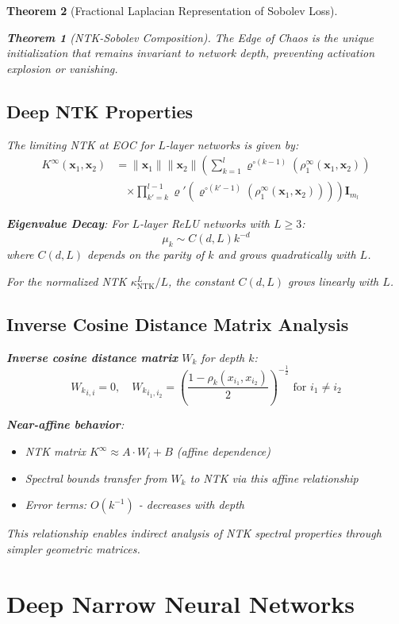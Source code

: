 \documentclass{article}
\newtheorem{theorem}{Theorem}[section]
\begin{document}
\begin{theorem}[Fractional Laplacian Representation of Sobolev Loss]
\begin{theorem}[NTK-Sobolev Composition]
The Edge of Chaos is the unique initialization that remains invariant to network depth, preventing activation explosion or vanishing.



\subsection{Deep NTK Properties}

The limiting NTK at EOC for $L$-layer networks is given by:
\begin{align}
K^{\infty}(\mathbf{x}_1, \mathbf{x}_2) &= \|\mathbf{x}_1\| \|\mathbf{x}_2\| \left( \sum_{k=1}^l \varrho^{\circ (k-1)}\left(\rho_1^{\infty}(\mathbf{x}_1, \mathbf{x}_2)\right) \right. \\
&\quad \left. \times \prod_{k'=k}^{l-1} \varrho'\left(\varrho^{\circ (k'-1)}\left(\rho_1^{\infty}(\mathbf{x}_1, \mathbf{x}_2)\right)\right) \right) \mathbf{I}_{m_l}
\end{align}

\textbf{Eigenvalue Decay}: For $L$-layer ReLU networks with $L \geq 3$:
\[ \mu_k \sim C(d, L)k^{-d} \]
where $C(d, L)$ depends on the parity of $k$ and grows quadratically with $L$.

For the normalized NTK $\kappa^L_{\text{NTK}}/L$, the constant $C(d, L)$ grows linearly with $L$.

\subsection{Inverse Cosine Distance Matrix Analysis}

\textbf{Inverse cosine distance matrix} $W_k$ for depth $k$:
\[ {W_k}_{i,i} = 0, \quad {W_k}_{i_1,i_2} = \left( \frac{1 - \rho_k(x_{i_1},x_{i_2})}{2} \right)^{-\frac{1}{2}} \text{ for } i_1 \neq i_2 \]

\textbf{Near-affine behavior}:
\begin{itemize}
\item NTK matrix $K^{\infty} \approx A \cdot W_l + B$ (affine dependence)
\item Spectral bounds transfer from $W_k$ to NTK via this affine relationship  
\item Error terms: $O(k^{-1})$ - decreases with depth
\end{itemize}

This relationship enables indirect analysis of NTK spectral properties through simpler geometric matrices.

\section{Deep Narrow Neural Networks}


\end{theorem}
\end{theorem}
\end{document}
